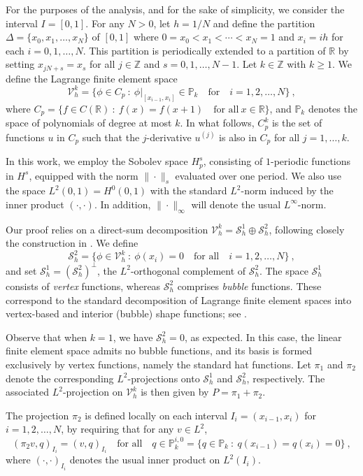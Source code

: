 \documentclass{amsart}
\begin{document}
For the purposes of the analysis, and for the sake of simplicity, we consider the interval $I=[0,1]$. For any $N>0$, let $h=1/N$ and define the partition
$\Delta=\{x_0,x_1,\dots, x_N\}$ of $[0,1]$
where $0=x_0<x_1<\cdots<x_N=1$ and $x_i=ih$ for each $i=0,1,\dots,N$. 
%
This partition is periodically extended to a partition of $\mathbb{R}$ by setting $x_{jN+s}=x_s$ for all $j\in\mathbb{Z}$ and $s=0,1,\dots,N-1$.  
%
Let $k\in\mathbb{Z}$ with $k\geq 1$. We define the Lagrange finite element space
$$\mathcal{V}_h^k=\{\phi\in C_p~:~ \phi|_{[x_{i-1},x_i]}\in\mathbb{P}_k \quad \text{for}\quad i=1,2,\dots,N\}\ ,$$
where $C_p=\{f\in C(\mathbb{R})~:~ f(x)=f(x+1)\quad \text{for all}~x\in\mathbb{R}\}$, and $\mathbb{P}_k$ denotes the space of polynomials of degree at most $k$. In what follows, $C_p^k$ is the set of functions $u$ in $C_p$ such that the $j$-derivative $u^{(j)}$ is also in $C_p$ for all $j=1,\dots,k$. 
%

In this work, we employ the Sobolev space $H^s_p$, consisting of $1$-periodic functions in $H^s$, equipped with the norm $\|\cdot\|_s$ evaluated over one period. We also use the space $L^2(0,1)=H^0(0,1)$ with the standard $L^2$-norm induced by the inner product $(\cdot,\cdot)$. In addition, $\|\cdot\|_\infty$ will denote the usual $L^\infty$-norm. 


Our proof relies on a direct-sum decomposition $\mathcal{V}_h^k=\mathcal{S}_h^1\oplus \mathcal{S}_h^2$, following closely the construction in \cite{CT1987}. We define
$$\mathcal{S}_h^2=\{\phi\in \mathcal{V}_h^k~:~ \phi(x_i)=0 \quad \text{for all}\quad i=1,2,\dots, N\}\ ,$$
and set $\mathcal{S}_h^1=(\mathcal{S}_h^2)^\perp$, the $L^2$-orthogonal complement of $\mathcal{S}_h^2$. 
%
The space $\mathcal{S}_h^1$ consists of \emph{vertex} functions, whereas $\mathcal{S}_h^2$ comprises \emph{bubble} functions. These correspond to the standard decomposition of Lagrange finite element spaces into vertex-based and interior (bubble) shape functions; see \cite{Solin}.

Observe that when $k = 1$, we have $\mathcal{S}_h^2 = {0}$, as expected. In this case, the linear finite element space admits no bubble functions, and its basis is formed exclusively by vertex functions, namely the standard hat functions.
%
Let $\pi_1$ and $\pi_2$ denote the corresponding $L^2$-projections onto $\mathcal{S}_h^1$ and $\mathcal{S}_h^2$, respectively. The associated $L^2$-projection on $\mathcal{V}_h^k$ is then given by $P=\pi_1+\pi_2$.

The projection $\pi_2$ is defined locally on each interval $I_i=(x_{i-1},x_i)$ for $i=1,2,\dots,N$, by requiring that for any $v\in L^2$,
$$(\pi_2 v,q)_{I_i}=(v,q)_{I_i} \quad \text{for all} \quad q\in \mathbb{P}_{k}^{i,0}=\{q\in\mathbb{P}_k~:~q(x_{i-1})=q(x_i)=0\}\ ,$$
where $(\cdot,\cdot)_{I_i}$ denotes the usual inner product on $L^2(I_i)$.
\end{document}
